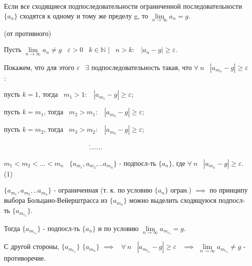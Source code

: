 \documentclass{article}
\begin{document}

\theorem

Если все сходящиеся подпоследовательности ограниченной последовательности $\{a_n\}$ сходятся к одному и тому же пределу g, то $\lim\limits_{n\to\infty}{a_n}=g$.

\proof (от противного)

Пусть \exists $\lim\limits_{n\to\infty}{a_n}\neq g$ \Leftrightarrow \exists \ $\varepsilon >0$ \ \forall $k \in \mathbb{N}$ | \exists \ $n>k:$ \ $|a_n-g|\geq \varepsilon$.

Покажем, что для этого $\varepsilon$ \ $\exists$ подпоследовательность такая, что $\forall \ n$ \ $|a_{m_n}-g|\geq \varepsilon$:

пусть $k=1$, тогда \exists \ $m_1>1:$ \ $|a_{m_1}-g|\geq \varepsilon$;

пусть $k=m_1$, тогда \exists \ $m_2>m_1:$ \ $|a_{m_2}-g|\geq \varepsilon$;

пусть $k=m_2$, тогда \exists \ $m_3>m_2:$ \ $|a_{m_3}-g|\geq \varepsilon$;

\ \ \ \ \ \ \ \ \ \ \ \ \ \ \ \ \ \ \ \ \ \ \ \ \ \........

$m_1<m_2<...<m_n$ \implies \ $\{a_{m_1}, a_{m_2},.. a_{m_n}\}$ - подпосл-ть $\{a_n\}$, где $\forall \ n$ \ $|a_{m_n}-g|\geq \varepsilon$. (1) 

$\{a_{m_1}, a_{m_2},.. a_{m_n}\}$ - ограниченная (т. к. по условию $\{a_n\}$ огран.) $\implies$ по принципу выбора Больцано-Вейерштрасса из $\{a_{m_n}\}$ можно выделить сходящуюся подпосл-ть $\{a_{m_{r_n}}\}$. 

Тогда $\{a_{m_{r_n}}\}$ - подпосл-ть $\{a_n\}$ и по условию $\lim\limits_{n\to\infty}{a_{m_{r_n}}}=g$. 

С другой стороны, $\{a_{m_{r_n}}\}$ \subset $\{a_{m_n}\}$ $\implies$ \ $\forall \ n$ \ $|a_{m_{r_n}}-g|\geq \varepsilon$ \ $\implies$ $\lim\limits_{n\to\infty}{a_{m_{r_n}}}\neq g$ - противоречие. 
\end{document}
